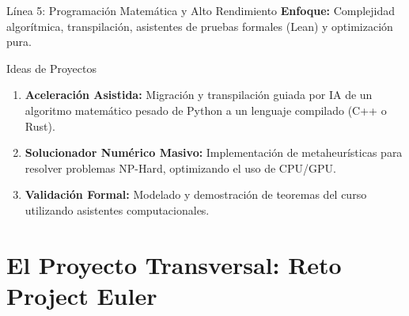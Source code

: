\documentclass[aspectratio=169]{beamer}
\begin{document}
\begin{frame}{Línea 5: Programación Matemática y Alto Rendimiento}
    \textbf{Enfoque:} Complejidad algorítmica, transpilación, asistentes de pruebas formales (Lean) y optimización pura.
    
    \vspace{0.3cm}
    \begin{exampleblock}{Ideas de Proyectos}
        \begin{enumerate}
            \item \textbf{Aceleración Asistida:} Migración y transpilación guiada por IA de un algoritmo matemático pesado de Python a un lenguaje compilado (C++ o Rust).
            \item \textbf{Solucionador Numérico Masivo:} Implementación de metaheurísticas para resolver problemas NP-Hard, optimizando el uso de CPU/GPU.
            \item \textbf{Validación Formal:} Modelado y demostración de teoremas del curso utilizando asistentes computacionales.
        \end{enumerate}
    \end{exampleblock}
\end{frame}

\section{El Proyecto Transversal: Reto Project Euler}
\end{document}
